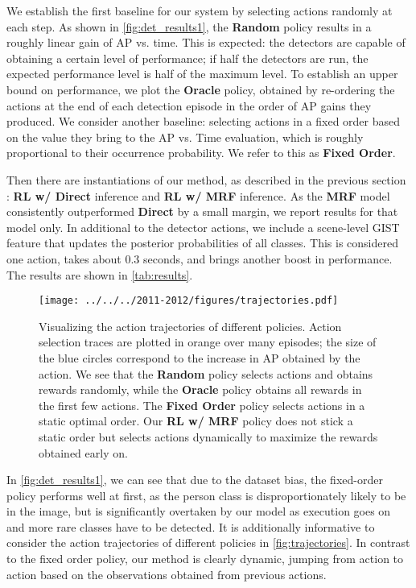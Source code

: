 We establish the first baseline for our system by selecting actions randomly at each step.
As shown in \autoref{fig:det_results1}, the \textbf{Random} policy results in a roughly linear gain of AP vs. time.
This is expected: the detectors are capable of obtaining a certain level of performance; if half the detectors are run, the expected performance level is half of the maximum level.
To establish an upper bound on performance, we plot the \textbf{Oracle} policy, obtained by re-ordering the actions at the end of each detection episode in the order of AP gains they produced.
We consider another baseline: selecting actions in a fixed order based on the value they bring to the AP vs. Time evaluation, which is roughly proportional to their occurrence probability.
We refer to this as \textbf{Fixed Order}.

Then there are instantiations of our method, as described in the previous section : \textbf{RL w/ Direct} inference and \textbf{RL w/ MRF} inference.
As the \textbf{MRF} model consistently outperformed \textbf{Direct} by a small margin, we report results for that model only.
In additional to the detector actions, we include a scene-level GIST feature that updates the posterior probabilities of all classes.
This is considered one action, takes about $0.3$ seconds, and brings another boost in performance.
The results are shown in \autoref{tab:results}.

\begin{figure}[h!]
  \centering
  \texttt{[image: ../../../2011-2012/figures/trajectories.pdf]}
  \caption{
Visualizing the action trajectories of different policies.
Action selection traces are plotted in orange over many episodes; the size of the blue circles correspond to the increase in AP obtained by the action.
We see that the \textbf{Random} policy selects actions and obtains rewards randomly, while the \textbf{Oracle} policy obtains all rewards in the first few actions.
The \textbf{Fixed Order} policy selects actions in a static optimal order.
Our \textbf{RL w/ MRF} policy does not stick a static order but selects actions dynamically to maximize the rewards obtained early on.
}
  \label{fig:trajectories}
\end{figure}

In \autoref{fig:det_results1}, we can see that due to the dataset bias, the fixed-order policy performs well at first, as the person class is disproportionately likely to be in the image, but is significantly overtaken by our model as execution goes on and more rare classes have to be detected.
It is additionally informative to consider the action trajectories of different policies in \autoref{fig:trajectories}.
In contrast to the fixed order policy, our method is clearly dynamic, jumping from action to action based on the observations obtained from previous actions.

